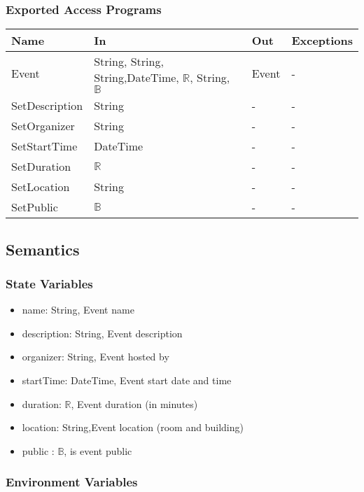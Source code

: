 \documentclass[12pt, titlepage]{article}
\begin{document}
\subsubsection{Exported Access Programs}
\begin{center}
\begin{tabular}{p{4cm} p{2cm} p{4cm} p{4cm}}
\hline
\textbf{Name} & \textbf{In} & \textbf{Out} & \textbf{Exceptions} \\
\hline
Event & String, String, String,DateTime, $\mathbb{R}$, String, $\mathbb{B}$ & Event & -\\
SetDescription & String & - & -\\
SetOrganizer & String & - & -\\
SetStartTime & DateTime & - & -\\
SetDuration & $\mathbb{R}$ & - & -\\
SetLocation & String & - & -\\
SetPublic & $\mathbb{B}$ & - & -\\
\hline
\end{tabular}
\end{center}

\subsection{Semantics}

\subsubsection{State Variables}

\begin{itemize}
\item name: String, Event name
\item description: String, Event description
\item organizer: String, Event hosted by
\item startTime: DateTime, Event start date and time
\item duration: $\mathbb{R}$, Event duration (in minutes)
\item location: String,Event location (room and building)
\item public : $\mathbb{B}$, is event public
\end{itemize}

\subsubsection{Environment Variables}
\end{document}
